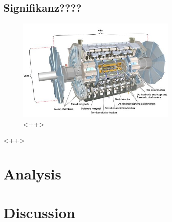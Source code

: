\documentclass[twoside,        %
               BCOR12mm,       %
               ngerman,english, %
               fleqn,headsepline=false,footsepline=false
              ]{Vorlage/MFPREPORT}
\begin{document}
\subsection{Signifikanz????}
\cite{signifikanz}

\begin{figure}[ ]
    \centering
    \includegraphics[width=0.7\textwidth]{fig/atlas}
    \caption{<++>}
    \label{fig:<+label+>}
\end{figure}<++>

\section{Analysis}
\label{sec:analysis}

\section{Discussion}
\label{sec:discussion}



\newpage

\begin{appendices}
\end{appendices}
\end{document}
